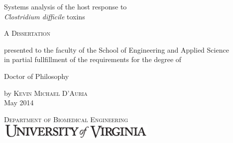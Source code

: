 \begin{titlepage}
\begin{caslonpro}


\center 

\vspace{1in}

{ \Huge Systems analysis of the host response to \\[0.1in]
      \emph{Clostridium difficile} toxins }\\[0.4cm] 
               
\vspace{0.9in}
       

\textsc{\LARGE A Dissertation}\\[0.3in] %

\vspace{0.6in}

presented to the faculty of the School
of Engineering and Applied Science \\
in partial fullfillment of the
requirements for the degree of

\vspace{0.3in} 

\Large Doctor of Philosophy

\vspace{1.3in}

by \textsc{ \huge Kevin Michael D'Auria } \\[0.05in]
\large May 2014

\vspace{1.4in}

\textsc{\Large Department of Biomedical Engineering}\\[0.1in] 
\includegraphics[width=3in]{TitlePage/uvaname.pdf}\\[0.02in]

\end{caslonpro}
\end{titlepage}


